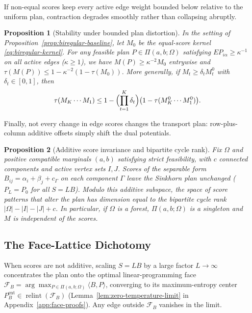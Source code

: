 \documentclass[10pt]{article}
\newtheorem{proposition}{Proposition}
\begin{document}
If non-equal scores keep every active edge weight bounded below relative to the uniform plan, contraction degrades smoothly rather than collapsing abruptly.

\begin{proposition}[Stability under bounded plan distortion]
\label{prop:plan-distortion-stability}
In the setting of Proposition~\ref{prop:biregular-baseline}, let $M_0$ be the equal-score kernel \eqref{eq:biregular-kernel}. For any feasible plan $P \in \Pi(a,b;\Omega)$ satisfying $E P_{i\alpha} \ge \kappa^{-1}$ on all active edges ($\kappa \ge 1$), we have $M(P) \ge \kappa^{-2} M_0$ entrywise and $\tau(M(P)) \le 1 - \kappa^{-2}(1 - \tau(M_0))$. More generally, if $M_t \ge \delta_t M_t^0$ with $\delta_t \in [0,1]$, then
\[
  \tau(M_K \cdots M_1) \le 1 - \Bigl(\prod_{t=1}^K \delta_t\Bigr)\bigl(1 - \tau(M_K^0 \cdots M_1^0)\bigr).
\]
\end{proposition}

Finally, not every change in edge scores changes the transport plan: row-plus-column additive offsets simply shift the dual potentials.

\begin{proposition}[Additive score invariance and bipartite cycle rank]
\label{prop:additive-score-invariance}
Fix $\Omega$ and positive compatible marginals $(a,b)$ satisfying strict feasibility, with $c$ connected components and active vertex sets $I, J$. Scores of the separable form $B_{ij} = \alpha_i + \beta_j + c_\Gamma$ on each component $\Gamma$ leave the Sinkhorn plan unchanged ($P_L = P_0$ for all $S = LB$). Modulo this additive subspace, the space of score patterns that alter the plan has dimension equal to the bipartite cycle rank $|\Omega| - |I| - |J| + c$. In particular, if $\Omega$ is a forest, $\Pi(a,b;\Omega)$ is a singleton and $M$ is independent of the scores.
\end{proposition}

\subsection{The Face-Lattice Dichotomy}

When scores are not additive, scaling $S = LB$ by a large factor $L \to \infty$ concentrates the plan onto the optimal linear-programming face $\mathcal{F}_B = \arg\max_{P\in\Pi(a,b;\Omega)} \langle B, P\rangle$, converging to its maximum-entropy center $P_B^{\mathrm{ent}} \in \operatorname{relint}(\mathcal{F}_B)$ (Lemma~\ref{lem:zero-temperature-limit} in Appendix~\ref{app:face-proofs}). Any edge outside $\mathcal{F}_B$ vanishes in the limit.
\end{document}
